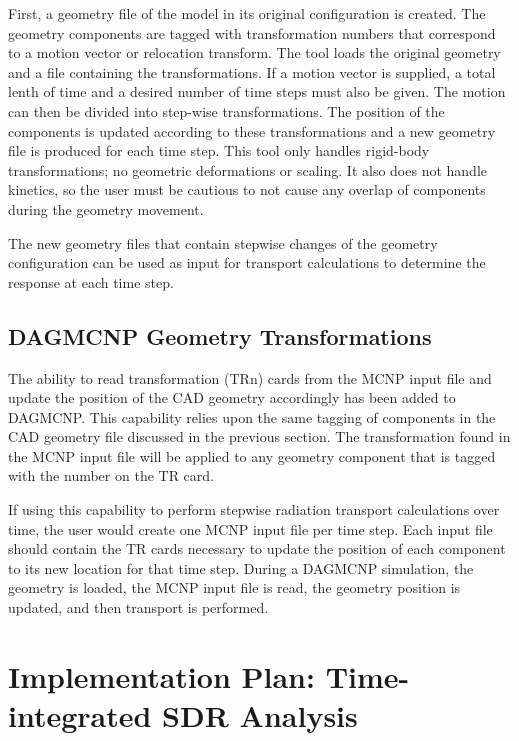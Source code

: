 First, a geometry file of the model in its 
original configuration is created. The geometry components are tagged with 
transformation numbers that correspond to a motion vector or relocation transform.
The tool loads the original geometry and a file containing the transformations.
If a motion vector is supplied, a total lenth of time and a desired number of 
time steps must also be given. The motion can then be divided into step-wise 
transformations. The position of the components 
is updated according to these transformations and a new geometry file is 
produced for each time step.  This tool only handles rigid-body
transformations; no geometric deformations or scaling.  It also does not handle kinetics, 
so the user must be cautious to not cause any overlap of components during the
geometry movement.

The new geometry files that contain stepwise changes of the geometry 
configuration can be used as input for
transport calculations to determine the response at each time step.


\subsection{DAGMCNP Geometry Transformations}\label{sec:mcnp_tr}
The ability to read transformation (TRn) cards from the MCNP input file and 
update the position of the CAD geometry accordingly has been added to DAGMCNP.  
This capability relies upon the same tagging of components in the CAD geometry 
file discussed in the previous section.  The transformation found in the MCNP 
input file will be applied to any geometry component that is tagged with the 
number on the TR card. 

If using this capability to perform stepwise radiation transport calculations
over time, the user would create one MCNP input file per time step.  Each input file 
should contain the TR cards necessary to update the position of each component 
to its new location for that time step.  During a DAGMCNP simulation, the 
geometry is loaded, the MCNP input file is read, the geometry position is 
updated, and then transport is performed.

\section{Implementation Plan: Time-integrated SDR Analysis}\label{sec:implementation}


